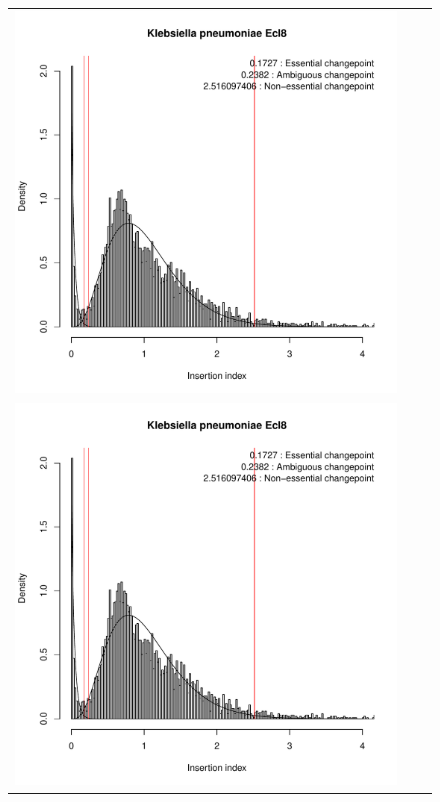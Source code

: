 \documentclass[12pt,letterpaper]{article}
\begin{document}
\begin{figure}
\begin{tabular}{c c c}
\includegraphics[page=9, scale=0.25]{essentiality.pdf}\\
\includegraphics[page=10, scale=0.25]{essentiality.pdf}&

\end{tabular}
\end{figure}
\end{document}

